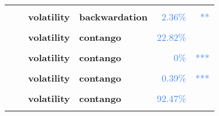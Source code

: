 \documentclass[
  authoryear,
  preprint,
  3p]{elsarticle}
\begin{document}
\begin{longtable}[t]{>{}l>{}l>{}l>{}l>{}r>{}r}
\textbf{\cellcolor{gray!10}{}} & \textbf{\cellcolor{gray!10}{financialisation}} & \textbf{\cellcolor{gray!10}{mean}} & \textbf{\cellcolor{gray!10}{backwardation}} & \textcolor[HTML]{4285f4}{\cellcolor{gray!10}{84.3\%}} & \textcolor[HTML]{4285f4}{\cellcolor{gray!10}{}}\\
\textbf{} & \textbf{} & \textbf{volatility} & \textbf{backwardation} & \textcolor[HTML]{4285f4}{2.36\%} & \textcolor[HTML]{4285f4}{**}\\
\addlinespace
\textbf{\cellcolor{gray!10}{}} & \textbf{\cellcolor{gray!10}{crisis}} & \textbf{\cellcolor{gray!10}{mean}} & \textbf{\cellcolor{gray!10}{backwardation}} & \textcolor[HTML]{4285f4}{\cellcolor{gray!10}{28.12\%}} & \textcolor[HTML]{4285f4}{\cellcolor{gray!10}{}}\\
\textbf{} & \textbf{} & \textbf{volatility} & \textbf{contango} & \textcolor[HTML]{4285f4}{22.82\%} & \textcolor[HTML]{4285f4}{}\\
\textbf{\cellcolor{gray!10}{}} & \textbf{\cellcolor{gray!10}{post-crisis}} & \textbf{\cellcolor{gray!10}{mean}} & \textbf{\cellcolor{gray!10}{backwardation}} & \textcolor[HTML]{4285f4}{\cellcolor{gray!10}{4.31\%}} & \textcolor[HTML]{4285f4}{\cellcolor{gray!10}{**}}\\
\textbf{} & \textbf{} & \textbf{volatility} & \textbf{contango} & \textcolor[HTML]{4285f4}{0\%} & \textcolor[HTML]{4285f4}{\vphantom{26} ***}\\
\textbf{\cellcolor{gray!10}{Orange juice-frozen concentrated (IFUS)}} & \textbf{\cellcolor{gray!10}{past}} & \textbf{\cellcolor{gray!10}{mean}} & \textbf{\cellcolor{gray!10}{contango}} & \textcolor[HTML]{4285f4}{\cellcolor{gray!10}{66.85\%}} & \textcolor[HTML]{4285f4}{\cellcolor{gray!10}{}}\\
\addlinespace
\textbf{} & \textbf{} & \textbf{volatility} & \textbf{contango} & \textcolor[HTML]{4285f4}{0.39\%} & \textcolor[HTML]{4285f4}{***}\\
\textbf{\cellcolor{gray!10}{}} & \textbf{\cellcolor{gray!10}{financialisation}} & \textbf{\cellcolor{gray!10}{mean}} & \textbf{\cellcolor{gray!10}{contango}} & \textcolor[HTML]{4285f4}{\cellcolor{gray!10}{28.81\%}} & \textcolor[HTML]{4285f4}{\cellcolor{gray!10}{}}\\
\textbf{} & \textbf{} & \textbf{volatility} & \textbf{contango} & \textcolor[HTML]{4285f4}{92.47\%} & \textcolor[HTML]{4285f4}{}\\
\textbf{\cellcolor{gray!10}{}} & \textbf{\cellcolor{gray!10}{crisis}} & \textbf{\cellcolor{gray!10}{mean}} & \textbf{\cellcolor{gray!10}{backwardation}} & \textcolor[HTML]{4285f4}{\cellcolor{gray!10}{67.55\%}} & \textcolor[HTML]{4285f4}{\cellcolor{gray!10}{}}\\

\end{longtable}
\end{document}
